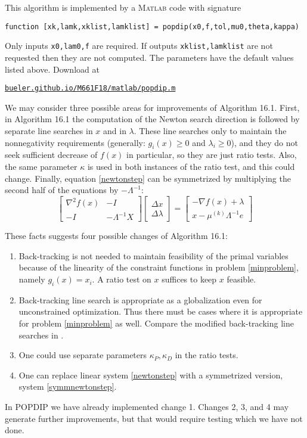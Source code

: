 \documentclass[11pt]{article}
\newcommand{\grad}{\nabla}
\newcommand{\Matlab}{\textsc{Matlab}\xspace}
\begin{document}
This algorithm is implemented by a \Matlab code with signature
\begin{center}
\texttt{function [xk,lamk,xklist,lamklist] = popdip(x0,f,tol,mu0,theta,kappa)}
\end{center}
Only inputs \texttt{x0,lam0,f} are required.  If outputs \texttt{xklist,lamklist} are not requested then they are not computed.  The parameters have the default values listed above.  Download at
\begin{center}
    \href{http://bueler.github.io/M661F18/matlab/popdip.m}{\texttt{bueler.github.io/M661F18/matlab/popdip.m}}
\end{center}

We may consider three possible areas for improvements of Algorithm 16.1.  First, in Algorithm 16.1 the computation of the Newton search direction is followed by separate line searches in $x$ and in $\lambda$.  These line searches only to maintain the nonnegativity requirements (generally: $g_i(x)\ge 0$ and $\lambda_i\ge 0$), and they do not seek sufficient decrease of $f(x)$ in particular, so they are just ratio tests.  Also, the same parameter $\kappa$ is used in both instances of the ratio test, and this could change.  Finally, equation \eqref{newtonstep} can be symmetrized by multiplying the second half of the equations by $-\Lambda^{-1}$:
\begin{equation}
\begin{bmatrix}
\grad^2 f(x) & - I \\
-I & - \Lambda^{-1} X
\end{bmatrix}
\begin{bmatrix}
\Delta x \\
\Delta \lambda
\end{bmatrix}
=
\begin{bmatrix}
-\grad f(x) + \lambda \\
x - \mu^{(k)} \Lambda^{-1} e
\end{bmatrix}
 \label{symmnewtonstep}
\end{equation}

These facts suggests four possible changes of Algorithm 16.1:
\begin{enumerate}
\item Back-tracking is not needed to maintain feasibility of the primal variables because of the linearity of the constraint functions in problem \eqref{minproblem}, namely $g_i(x)=x_i$.  A ratio test on $x$ suffices to keep $x$ feasible.
\item Back-tracking line search is appropriate as a globalization even for unconstrained optimization.  Thus there must be cases where it is appropriate for problem \eqref{minproblem} as well.  Compare the modified back-tracking line searches in \cite{BensonMunson2006}.
\item One could use separate parameters $\kappa_P,\kappa_D$ in the ratio tests.
\item One can replace linear system \eqref{newtonstep} with a symmetrized version, system \eqref{symmnewtonstep}.
\end{enumerate}
In POPDIP we have already implemented change 1.  Changes 2, 3, and 4 may generate further improvements, but that would require testing which we have not done.
\end{document}
